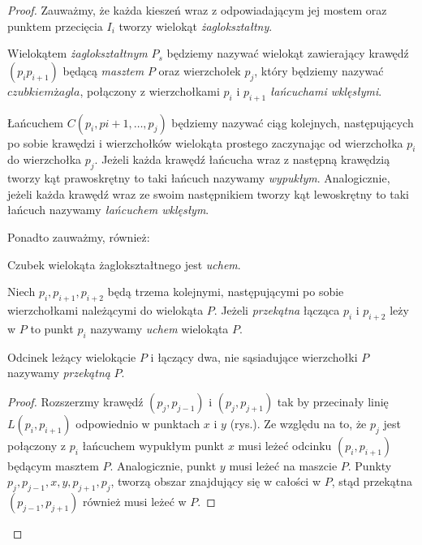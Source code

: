 \begin{proof}
  Zauważmy, że każda kieszeń wraz z odpowiadającym jej mostem oraz
  punktem przecięcia $I_i$ tworzy wielokąt \emph{żaglokształtny}.

  \begin{definicja}
    Wielokątem \emph{żaglokształtnym} $P_s$ będziemy nazywać wielokąt
    zawierający krawędź $(p_{i}p_{i+1})$ będącą \emph{masztem} $P$
    oraz wierzchołek $p_j$, który będziemy nazywać $czubkiem żagla$,
    połączony z wierzchołkami $p_i$ i $p_{i+1}$ \emph{łańcuchami
      wklęsłymi}.
  \end{definicja}

  \begin{definicja}
    Łańcuchem $C(p_i,p{i+1},\ldots,p_j)$ będziemy nazywać ciąg
    kolejnych, następujących po sobie krawędzi i wierzchołków
    wielokąta prostego zaczynając od wierzchołka $p_i$ do wierzchołka
    $p_j$. Jeżeli każda krawędź łańcucha wraz z następną krawędzią
    tworzy kąt prawoskrętny to taki łańcuch nazywamy
    \emph{wypukłym}. Analogicznie, jeżeli każda krawędź wraz ze swoim
    następnikiem tworzy kąt lewoskrętny to taki łańcuch nazywamy
    \emph{łańcuchem wklęsłym}.
  \end{definicja}

  Ponadto zauważmy, również:

  \begin{lemat}\label{lem:sailtip}
    Czubek wielokąta żaglokształtnego jest \emph{uchem}.
  \end{lemat}

  \begin{definicja}\label{def:ear}
    Niech $p_i, p_{i+1}, p_{i+2}$ będą trzema kolejnymi, następującymi
    po sobie wierzchołkami należącymi do wielokąta $P$. Jeżeli
    \emph{przekątna} łącząca $p_{i}$ i $p_{i+2}$ leży w $P$ to punkt
    $p_i$ nazywamy \emph{uchem} wielokąta $P$.
  \end{definicja}

  \begin{definicja}
    Odcinek leżący wielokącie $P$ i łączący dwa, nie sąsiadujące
    wierzchołki $P$ nazywamy \emph{przekątną} $P$.
  \end{definicja}

  \begin{proof}
    Rozszerzmy krawędź $(p_j,p_{j-1})$ i $(p_j, p_{j+1})$ tak by
    przecinały linię $L(p_i, p_{i+1})$ odpowiednio w punktach $x$ i
    $y$ (rys.). Ze względu na to, że $p_j$ jest połączony z $p_i$
    łańcuchem wypukłym punkt $x$ musi leżeć odcinku $(p_i, p_{i+1})$
    będącym masztem $P$. Analogicznie, punkt $y$ musi leżeć na maszcie
    $P$. Punkty $p_j, p_{j-1}, x, y, p_{j+1}, p_j$, tworzą obszar
    znajdujący się w całości w $P$, stąd przekątna $(p_{j-1},
    p_{j+1})$ również musi leżeć w $P$.
  \end{proof}


\end{proof}
